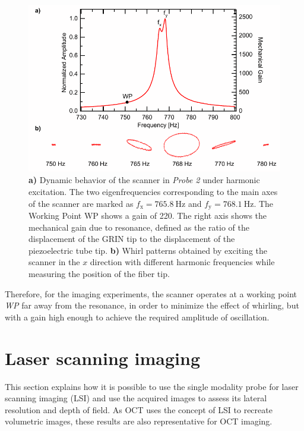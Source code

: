 \begin{figure}[h!]\centering \includegraphics{figures/50_Measurements/bode/bodeWhirl.pdf}
      \caption{\textbf{a)} Dynamic behavior of the scanner in \textit{Probe 2} under harmonic excitation. The two eigenfrequencies corresponding to the main axes of the scanner are marked as $f_\mathrm{x} = \SI{765.8}{\hertz}$ and $f_\mathrm{y} = \SI{768.1}{\hertz}$.
      The Working Point WP shows a gain of 220. 
      The right axis shows the mechanical gain due to resonance, defined as the ratio of the displacement of the GRIN tip to the displacement of the piezoelectric tube tip.
      \textbf{b)} Whirl patterns obtained by exciting the scanner in the $x$ direction with different harmonic frequencies while measuring the position of the fiber tip. }
      \label{fig:bode}
\end{figure}

Therefore, for the imaging experiments, the scanner operates at a working point \textit{WP} far away from the resonance, in order to minimize the effect of whirling, but with a gain high enough to achieve the required amplitude of oscillation.


\section{Laser scanning imaging}
This section explains how it is possible to use the single modality probe for laser scanning imaging (LSI) and use the acquired images to assess its lateral resolution and depth of field. As OCT uses the concept of LSI to recreate volumetric images, these results are also representative for OCT imaging.

